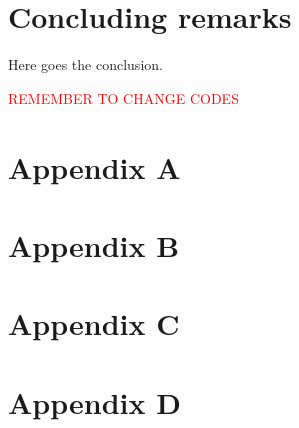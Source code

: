 \documentclass{Trade_template}
\numberwithin{equation}{section}
\begin{document}
\chapter{Concluding remarks} \label{Concluding remarks}

Here goes the conclusion.

\textcolor{red}{REMEMBER TO CHANGE CODES}

\newpage

\nocite{*}


\newpage

\chapter*{Appendix A} \label{Appendix A}



\chapter*{Appendix B} \label{Appendix B}



\newpage

\chapter*{Appendix C} \label{Appendix C}



\newpage

\chapter*{Appendix D} \label{Appendix D}


\end{document}
